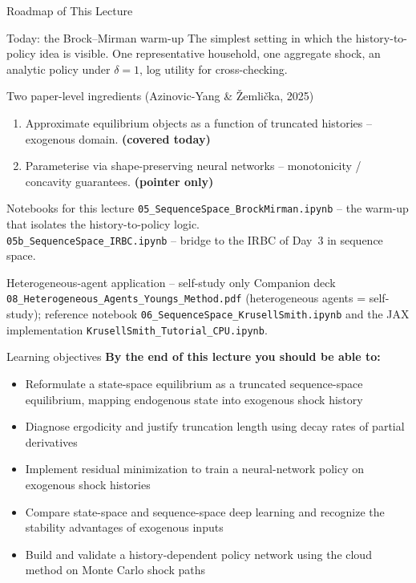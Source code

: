 \documentclass[aspectratio=169,11pt]{beamer}
\newcommand{\emphc}[1]{\textcolor{harvardcrimson}{#1}}
\begin{document}
\begin{frame}[shrink=10]{Roadmap of This Lecture}
\small
\begin{block}{Today: the Brock--Mirman warm-up}
The simplest setting in which the history-to-policy idea is visible. One representative household, one aggregate shock, an analytic policy under $\delta=1$, log utility for cross-checking.
\end{block}

\begin{block}{Two paper-level ingredients (Azinovic-Yang \& \v{Z}emli\v{c}ka, 2025)}
\begin{enumerate}\itemsep1pt
    \item Approximate equilibrium objects as a function of \emphc{truncated histories} -- exogenous domain. \;\textbf{(covered today)}
    \item Parameterise via \emphc{shape-preserving neural networks} -- monotonicity / concavity guarantees. \;\textbf{(pointer only)}
\end{enumerate}
\end{block}

\begin{block}{Notebooks for this lecture}
\texttt{05\_SequenceSpace\_BrockMirman.ipynb} -- the warm-up that isolates the history-to-policy logic.\\
\texttt{05b\_SequenceSpace\_IRBC.ipynb} -- bridge to the IRBC of Day~3 in sequence space.
\end{block}

\begin{block}{Heterogeneous-agent application -- self-study only}
Companion deck \texttt{08\_Heterogeneous\_Agents\_Youngs\_Method.pdf} (heterogeneous agents = self-study); reference notebook \texttt{06\_SequenceSpace\_KrusellSmith.ipynb} and the JAX implementation \texttt{KrusellSmith\_Tutorial\_CPU.ipynb}.
\end{block}
\end{frame}

\begin{frame}{Learning objectives}
\textbf{By the end of this lecture you should be able to:}
\begin{itemize}
  \item Reformulate a state-space equilibrium as a truncated sequence-space equilibrium, mapping endogenous state into exogenous shock history
  \item Diagnose ergodicity and justify truncation length using decay rates of partial derivatives
  \item Implement residual minimization to train a neural-network policy on exogenous shock histories
  \item Compare state-space and sequence-space deep learning and recognize the stability advantages of exogenous inputs
  \item Build and validate a history-dependent policy network using the cloud method on Monte Carlo shock paths
\end{itemize}
\end{frame}
\end{document}

